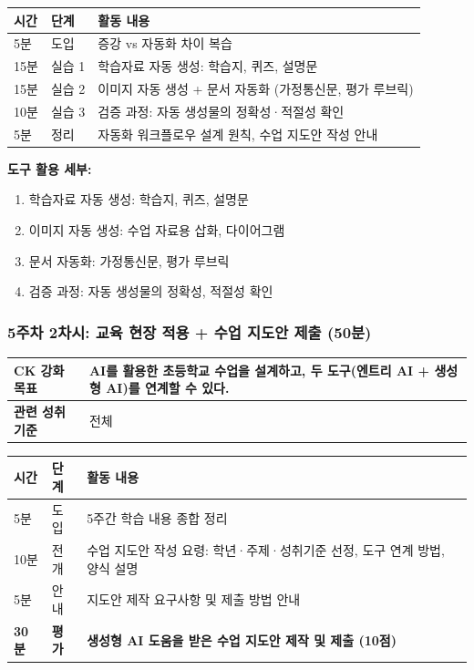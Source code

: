 \documentclass[a4paper,11pt]{article}
\begin{document}
\vspace{0.3em}\noindent
\begin{tabularx}{\textwidth}{|>{\centering\arraybackslash}p{1cm}|>{\centering\arraybackslash}p{1.5cm}|X|}
\hline
\textbf{시간} & \textbf{단계} & \textbf{활동 내용} \\ \hline
5분 & 도입 & 증강 vs 자동화 차이 복습 \\ \hline
15분 & 실습 1 & 학습자료 자동 생성: 학습지, 퀴즈, 설명문 \\ \hline
15분 & 실습 2 & 이미지 자동 생성 + 문서 자동화 (가정통신문, 평가 루브릭) \\ \hline
10분 & 실습 3 & 검증 과정: 자동 생성물의 정확성·적절성 확인 \\ \hline
5분 & 정리 & 자동화 워크플로우 설계 원칙, 수업 지도안 작성 안내 \\ \hline
\end{tabularx}

\textbf{도구 활용 세부:}
\begin{enumerate}[nosep,start=34]
\item 학습자료 자동 생성: 학습지, 퀴즈, 설명문
\item 이미지 자동 생성: 수업 자료용 삽화, 다이어그램
\item 문서 자동화: 가정통신문, 평가 루브릭
\item 검증 과정: 자동 생성물의 정확성, 적절성 확인
\end{enumerate}

\subsubsection{5주차 2차시: 교육 현장 적용 + 수업 지도안 제출 (50분)}

\noindent
\begin{tabularx}{\textwidth}{|>{\bfseries\arraybackslash}p{2.5cm}|X|}
\hline
CK 강화 목표 & AI를 활용한 초등학교 수업을 설계하고, 두 도구(엔트리 AI + 생성형 AI)를 연계할 수 있다. \\ \hline
관련 성취기준 & 전체 \\ \hline
\end{tabularx}

\vspace{0.3em}\noindent
\begin{tabularx}{\textwidth}{|>{\centering\arraybackslash}p{1cm}|>{\centering\arraybackslash}p{1.5cm}|X|}
\hline
\textbf{시간} & \textbf{단계} & \textbf{활동 내용} \\ \hline
5분 & 도입 & 5주간 학습 내용 종합 정리 \\ \hline
10분 & 전개 & 수업 지도안 작성 요령: 학년·주제·성취기준 선정, 도구 연계 방법, 양식 설명 \\ \hline
5분 & 안내 & 지도안 제작 요구사항 및 제출 방법 안내 \\ \hline
\textbf{30분} & \textbf{평가} & \textbf{생성형 AI 도움을 받은 수업 지도안 제작 및 제출 (10점)} \\ \hline
\end{tabularx}
\end{document}
